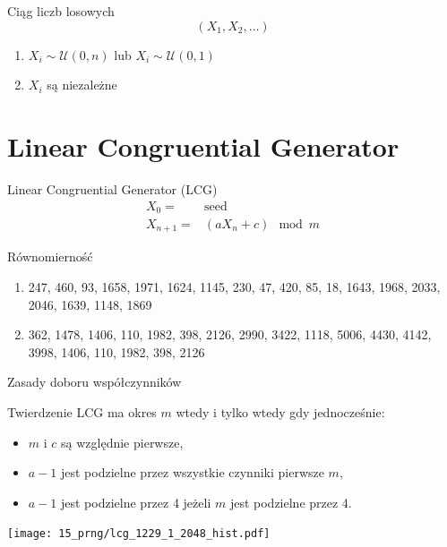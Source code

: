\documentclass{mp}
\begin{document}
\begin{frame}{Ciąg liczb losowych}
\[ (X_1, X_2, \ldots) \]
\begin{enumerate}
\item \alert{$X_i\sim\mathcal{U}(0,n)$}  lub \alert{$X_i\sim\mathcal{U}(0,1)$}
\item $X_i$ są niezależne
\end{enumerate}
\end{frame}

\section{Linear Congruential Generator}

\begin{frame}{Linear Congruential Generator (LCG)}
\begin{align*}
X_0 = & \text{seed} \\
X_{n+1} = & (aX_n+c) \mod m
\end{align*}
\end{frame}
\begin{frame}{Równomierność}
\centering
{}
{
\begin{enumerate}
\item 247, 460, 93, 1658, 1971, 1624, 1145, 230, 47, 420, 85, 18, 1643, 1968, 2033, 2046, 1639, 1148, 1869
\item 362, 1478, 1406, 110, 1982, 398, 2126, 2990, 3422, 1118, 5006, 4430, 4142, 3998, \alert{1406, 110, 1982, 398, 2126}
\end{enumerate}
}
\end{frame}
\begin{frame}{Zasady doboru współczynników}
\begin{block}{Twierdzenie}
LCG ma okres $m$ wtedy i tylko wtedy gdy jednocześnie:
\begin{itemize}
\item $m$ i $c$ są względnie pierwsze,
\item $a-1$ jest podzielne przez wszystkie czynniki pierwsze $m$,
\item $a-1$ jest podzielne przez 4 jeżeli $m$ jest podzielne przez 4.
\end{itemize}
\end{block}
\pause
\begin{minipage}{.49\textwidth}
\texttt{[image: 15\_prng/lcg\_1229\_1\_2048\_hist.pdf]}
\end{minipage}
\begin{minipage}{.49\textwidth}
\end{minipage}
\end{frame}
\end{document}
